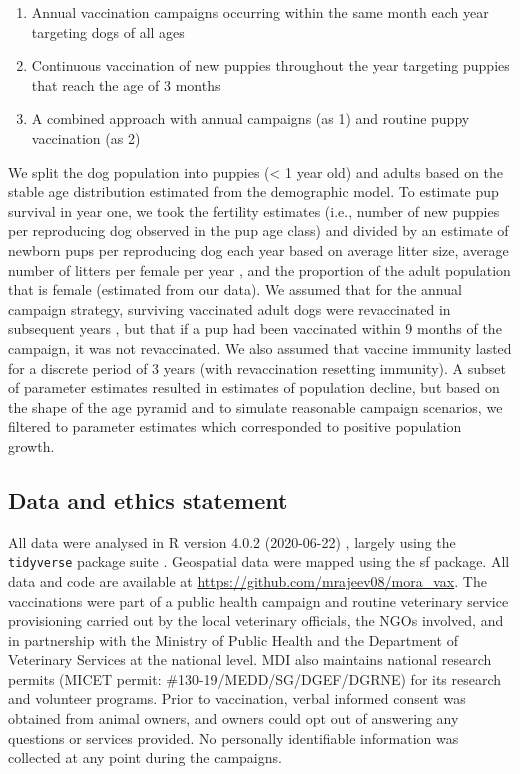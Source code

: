 \documentclass[tropicalmed,article,submit,moreauthors,pdftex]{mdpi}
\providecommand{\tightlist}{%
  \setlength{\itemsep}{0pt}\setlength{\parskip}{4pt}}
\begin{document}
\begin{enumerate}
\def\labelenumi{\arabic{enumi})}
\tightlist
\item
  Annual vaccination campaigns occurring within the same month each year
  targeting dogs of all ages
\item
  Continuous vaccination of new puppies throughout the year targeting
  puppies that reach the age of 3 months
\item
  A combined approach with annual campaigns (as 1) and routine puppy
  vaccination (as 2)
\end{enumerate}

We split the dog population into puppies (\textless{} 1 year old) and
adults based on the stable age distribution estimated from the
demographic model. To estimate pup survival in year one, we took the
fertility estimates (i.e., number of new puppies per reproducing dog
observed in the pup age class) and divided by an estimate of newborn
pups per reproducing dog each year based on average litter size, average
number of litters per female per year
\citep{hampson2009, morters2014, czupryna2016}, and the proportion of
the adult population that is female (estimated from our data). We
assumed that for the annual campaign strategy, surviving vaccinated
adult dogs were revaccinated in subsequent years
\citep{delriovilas2017}, but that if a pup had been vaccinated within 9
months of the campaign, it was not revaccinated. We also assumed that
vaccine immunity lasted for a discrete period of 3 years (with
revaccination resetting immunity). A subset of parameter estimates
resulted in estimates of population decline, but based on the shape of
the age pyramid and to simulate reasonable campaign scenarios, we
filtered to parameter estimates which corresponded to positive
population growth.

\hypertarget{data-and-ethics-statement}{%
\subsection{Data and ethics statement}\label{data-and-ethics-statement}}

All data were analysed in R version 4.0.2 (2020-06-22) \citep{R2020},
largely using the \texttt{tidyverse} package suite \citep{wickham2019}.
Geospatial data were mapped using the sf \citep{sf} package. All data
and code are available at \url{https://github.com/mrajeev08/mora_vax}.
The vaccinations were part of a public health campaign and routine
veterinary service provisioning carried out by the local veterinary
officials, the NGOs involved, and in partnership with the Ministry of
Public Health and the Department of Veterinary Services at the national
level. MDI also maintains national research permits (MICET permit:
\#130-19/MEDD/SG/DGEF/DGRNE) for its research and volunteer programs.
Prior to vaccination, verbal informed consent was obtained from animal
owners, and owners could opt out of answering any questions or services
provided. No personally identifiable information was collected at any
point during the campaigns.
\end{document}

